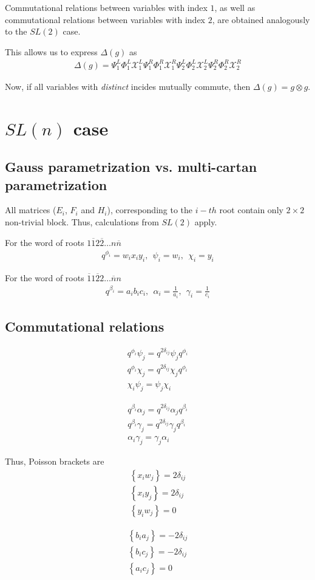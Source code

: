 \documentclass{paper}
\def\be{\begin{eqnarray}}
\def\ee{\end{eqnarray}}
\def\dg{\Delta \lb g \rb}
\def\lb{\left (}
\def\rb{\right )}
\def\lcb{\left \{}
\def\rcb{\right \}}
\def\gog{g \otimes g}
\def\Chi{\mathcal{X}}
\newcommand{\EChiLi}[1]{\Chi_#1^L}
\newcommand{\EChiRi}[1]{\Chi_#1^R}
\newcommand{\EPsiLi}[1]{\Psi_#1^L}
\newcommand{\EPsiRi}[1]{\Psi_#1^R}
\newcommand{\QPhiLi}[1]{\Phi_#1^L}
\newcommand{\QPhiRi}[1]{\Phi_#1^R}
\newcommand{\EBlockLi}[1]{\EPsiLi{#1} \QPhiLi{#1} \EChiLi{#1}}
\newcommand{\EBlockRi}[1]{\EPsiRi{#1} \QPhiRi{#1} \EChiRi{#1}}
\begin{document}
Commutational relations between variables with index $1$,
as well as commutational relations between variables with index $2$,
are obtained analogously to the $SL(2)$ case.

This allows us to express $\dg$ as
\be
\dg = \EBlockLi{1} \EBlockRi{1} \EBlockLi{2} \EBlockRi{2}
\ee

Now, if all variables with {\it distinct} incides mutually commute,
then $\dg = \gog$.

\section{$SL(n)$ case}


\subsection{Gauss parametrization vs. multi-cartan parametrization}

All matrices ($E_i$, $F_i$ and $H_i$), corresponding to the $i-th$ root contain
only $2\times2$ non-trivial block. Thus, calculations from $SL(2)$ apply.

For the word of roots $1\overline{1}2\overline{2} \dots n \overline{n}$
\be
q^{\phi_i} = w_i x_i y_i,\ \ \psi_i = w_i,\ \ \chi_i = y_i
\ee

For the word of roots $\overline{1}1\overline{2}2 \dots \overline{n} n$
\be
q^{\beta_i} = a_i b_i c_i,\ \ \alpha_i = \frac{1}{a_i},\ \ \gamma_i = \frac{1}{c_i}
\ee

\subsection{Commutational relations}
\be
q^{\phi_i} \psi_j = q^{2\delta_{ij}} \psi_j q^{\phi_i} \\
q^{\phi_i} \chi_j = q^{2\delta_{ij}} \chi_j q^{\phi_i} \\
\chi_i \psi_j = \psi_j \chi_i
\ee

\be
q^{\beta_i} \alpha_j = q^{2\delta_{ij}} \alpha_j q^{\beta_i} \\
q^{\beta_i} \gamma_j = q^{2\delta_{ij}} \gamma_j q^{\beta_i} \\
\alpha_i \gamma_j = \gamma_j \alpha_i
\ee

Thus, Poisson brackets are
\be
\lcb x_i w_j\rcb = 2 \delta_{ij} \\
\lcb x_i y_j\rcb = 2 \delta_{ij} \\
\lcb y_i w_j\rcb = 0
\ee

\be
\lcb b_i a_j\rcb = -2 \delta_{ij} \\
\lcb b_i c_j\rcb = -2 \delta_{ij} \\
\lcb a_i c_j\rcb = 0
\ee
\end{document}
